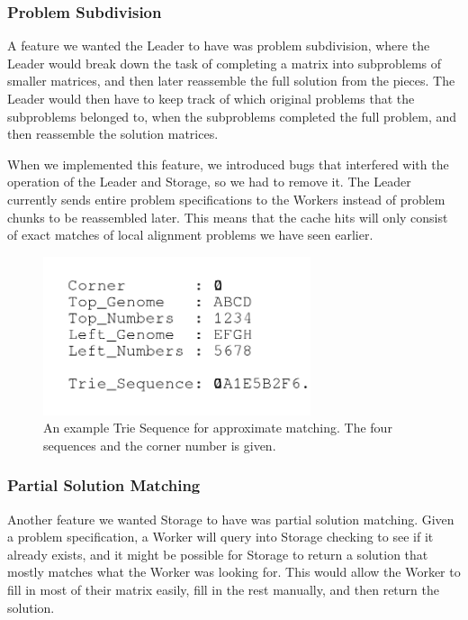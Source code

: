 \documentclass[11pt]{article}
\begin{document}
\subsubsection{Problem Subdivision}
A feature we wanted the Leader to have was problem subdivision, where the Leader would break down the task of completing a matrix into subproblems of smaller matrices, and then later reassemble the full solution from the pieces. The Leader would then have to keep track of which original problems that the subproblems belonged to, when the subproblems completed the full problem, and then reassemble the solution matrices.
  
When we implemented this feature, we introduced bugs that interfered with the operation of the Leader and Storage, so we had to remove it. The Leader currently sends entire problem specifications to the Workers instead of problem chunks to be reassembled later. This means that the cache hits will only consist of exact matches of local alignment problems we have seen earlier. 


\begin{figure}
  \centering 
  \includegraphics[width=0.7\textwidth]{trie_corrected}
  \caption{An example Trie Sequence for approximate matching. The four sequences and the corner number is given.}
  \label{fig:trie}
\end{figure}


\subsubsection{Partial Solution Matching}

Another feature we wanted Storage to have was partial solution matching. Given a problem specification, a Worker will query into Storage checking to see if it already exists, and it might be possible for Storage to return a solution that mostly matches what the Worker was looking for. This would allow the Worker to fill in most of their matrix easily, fill in the rest manually, and then return the solution.
\end{document}
